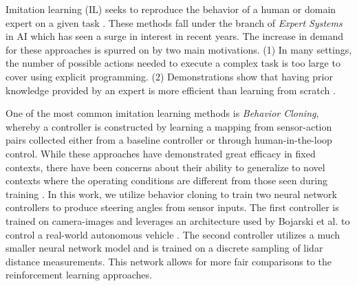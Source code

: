 \documentclass[manuscript,screen,review]{acmart}
\newcommand{\todo}[1]{\textcolor{red}{\textbf{\underline{TODO:}} #1}}
\begin{document}
Imitation learning (IL) seeks to reproduce the behavior of a human or domain expert on a given task \cite{Hussein2017ImitationL}. These methods fall under the branch of \textit{Expert Systems} in AI which has seen a surge in interest in recent years. The increase in demand for these approaches is spurred on by two main motivations. (1) In many settings, the number of possible actions needed to execute a complex task is too large to cover using explicit programming. (2) Demonstrations show that having prior knowledge provided by an expert is more efficient than learning from scratch \cite{Hussein2017ImitationL}.

One of the most common imitation learning methods is \textit{Behavior Cloning}, whereby a controller is constructed by learning a mapping from sensor-action pairs collected either from a baseline controller or through human-in-the-loop control. While these approaches have demonstrated great efficacy in fixed contexts, there have been concerns about their ability to generalize to novel contexts where the operating conditions are different from those seen during training \cite{Majumdar2017}.
In this work, we utilize behavior cloning to train two neural network controllers to produce steering angles from sensor inputs. The first controller is trained on camera-images and leverages an architecture used by Bojarski et al. to control a real-world autonomous vehicle \cite{bojarski2016end}. The second controller utilizes a much smaller neural network model and is trained on a discrete sampling of lidar distance measurements. This network allows for more fair comparisons to the reinforcement learning approaches. %
\end{document}
